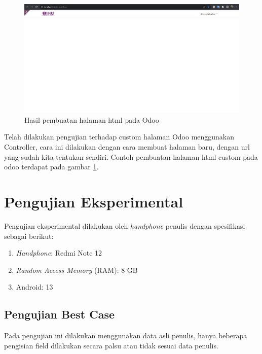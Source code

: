 \begin{figure}[H]
	\centering
	\includegraphics[scale=0.4]{Gambar/controllerOdoo.png}
	\caption{Hasil pembuatan halaman html pada Odoo} 
	\label{fig:controllerOdoo}
\end{figure}

Telah dilakukan pengujian terhadap custom halaman Odoo menggunakan Controller, cara ini dilakukan dengan cara membuat halaman baru, dengan url yang sudah kita tentukan sendiri. Contoh pembuatan halaman html custom pada odoo terdapat pada gambar \ref{fig:controllerOdoo}.


\section{Pengujian Eksperimental}
\label{sec:pengujianEksperimental}

Pengujian eksperimental dilakukan oleh \textit{handphone} penulis dengan spesifikasi sebagai berikut:

\begin{enumerate}
	\item \textit{Handphone}: Redmi Note 12
	\item \textit{Random Access Memory} (RAM): 8 GB
	\item Android: 13
\end{enumerate}

\subsection{Pengujian Best Case}
\label{sec:pengujianBest}

Pada pengujian ini dilakukan menggunakan data asli penulis, hanya beberapa pengisian field dilakukan secara palsu atau tidak sesuai data penulis.

